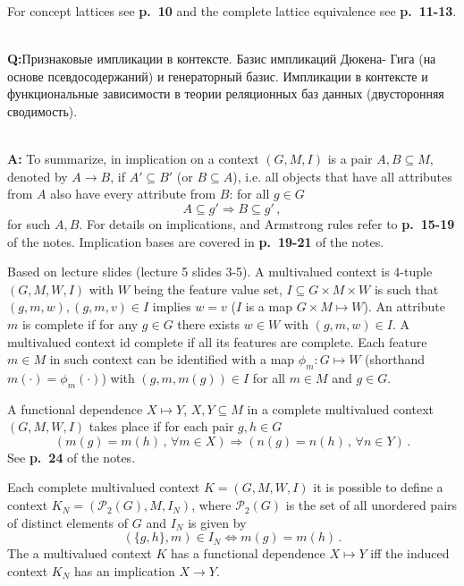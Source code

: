 \documentclass[a4paper]{article}
\newcommand{\rus}[1]{\foreignlanguage{russian}{#1}}
\begin{document}
\noindent For concept lattices see \textbf{p.~10} and the complete lattice equivalence
see \textbf{p.~11-13}.

\hfill\\\textbf{Q:}\rus{Признаковые импликации в контексте. Базис импликаций Дюкена-
Гига (на основе псевдосодержаний) и генераторный базис. Импликации в контексте и
функциональные зависимости в теории реляционных баз данных (двусторонняя сводимость).}

\hfill\\\textbf{A:}
To summarize, in implication on a context $(G, M, I)$ is a pair $A, B\subseteq M$,
denoted by $A\to B$, if $A'\subseteq B'$ (or $B\subseteq  A$), i.e. all objects that
have all attributes from $A$ also have every attribute from $B$: for all $g\in G$
$$ A\subseteq g' \Rightarrow B \subseteq g'\,, $$
for such $A, B$. For details on implications, and Armstrong rules refer to \textbf{p.~15-19}
of the notes. Implication bases are covered in \textbf{p.~19-21} of the notes.

Based on lecture slides (lecture 5 slides 3-5). A multivalued context is $4$-tuple
$(G, M, W, I)$ with $W$ being the feature value set, $I\subseteq G\times M \times W$
is such that $(g,m,w), (g,m,v)\in I$ implies $w=v$ ($I$ is a map $G\times M\mapsto W$).
An attribute $m$ is complete if for any $g \in G$ there exists $w\in W$ with $(g,m,w)
\in I$. A multivalued context id complete if all its features are complete.
Each feature $m\in M$ in such context can be identified with a map $\phi_m:G\mapsto W$
(shorthand $m(\cdot) = \phi_m(\cdot)$) with $(g, m, m(g))\in I$ for all $m\in M$
and $g\in G$.

A functional dependence $X\mapsto Y$, $X, Y\subseteq M$ in a complete multivalued
context $(G, M, W, I)$ takes place if for each pair $g, h\in G$
$$ (m(g) = m(h)\,,\, \forall m\in X)
    \Rightarrow (n(g) = n(h)\,,\, \forall n\in Y)
    \,. $$
See \textbf{p.~24} of the notes.

Each complete multivalued context $K = (G, M, W, I)$ it is possible to define a context
$K_N = (\mathcal{P}_2(G), M, I_N)$, where $\mathcal{P}_2(G)$ is the set of all unordered
pairs of distinct elements of $G$ and $I_N$ is given by
$$ (\{g, h\}, m) \in I_N
    \Leftrightarrow m(g) = m(h)
    \,. $$
The a multivalued context $K$ has a functional dependence $X\mapsto Y$ iff the induced
context $K_N$ has an implication $X\to Y$.
\end{document}
